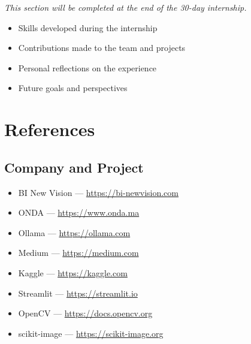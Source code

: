 \documentclass[12pt, a4paper]{article}
\begin{document}
\textit{This section will be completed at the end of the 30-day internship.}

\begin{itemize}
  \item Skills developed during the internship
  \item Contributions made to the team and projects
  \item Personal reflections on the experience
  \item Future goals and perspectives
\end{itemize}

\newpage
\section*{\color{navyblue} References}

\subsection*{Company and Project}
\begin{itemize}
  \item BI New Vision --- \url{https://bi-newvision.com}
  \item ONDA --- \url{https://www.onda.ma}
  \item Ollama --- \url{https://ollama.com}
  \item Medium --- \url{https://medium.com}
  \item Kaggle --- \url{https://kaggle.com}
  \item Streamlit --- \url{https://streamlit.io}
  \item OpenCV --- \url{https://docs.opencv.org}
  \item scikit-image --- \url{https://scikit-image.org}
\end{itemize}
\end{document}
